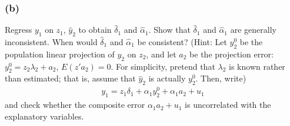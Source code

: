 \documentclass[10pt, a4paper]{article}
\begin{document}
  \subsubsection*{(b)}
    Regress $y_1$ on $z_1$, $\hat{y}_2$ to obtain $\hat{\delta}_1$ and $\hat{\alpha}_1$. Show that $\hat{\delta}_1$ and $\hat{\alpha}_1$ are generally inconsistent. When would $\hat{\delta}_1$ and $\hat{\alpha}_1$ be consistent? (Hint: Let $y_2^0$ be the population linear projection of $y_2$ on $z_2$, and let $a_2$ be the projection error: $y_2^0 = z_2 \lambda_2 + a_2$, $E(z'a_2) = 0$. For simplicity, pretend that $\lambda_2$ is known rather than estimated; that is, assume that $\hat{y}_2$ is actually $y_2^0$. Then, write)
    \begin{gather}
      y_1 = z_1 \delta_1 + \alpha_1 y_2^0 + \alpha_1 a_2 + u_1
    \end{gather}
    and check whether the composite error $\alpha_1 a_2 + u_1$ is uncorrelated with the explanatory variables.
\end{document}
